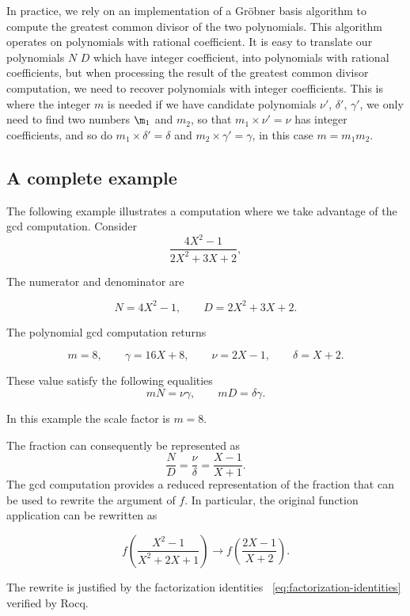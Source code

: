 \documentclass[11pt]{article}
\begin{document}
In practice, we rely on an implementation of a Gröbner basis algorithm to
compute the greatest common divisor of the two polynomials.  This algorithm
operates on polynomials with rational coefficient.  It is easy to translate
our polynomials \(N\) \(D\) which have integer coefficient, into polynomials
with rational coefficients, but when processing the result of the greatest
common divisor computation, we need to recover polynomials with integer
coefficients.  This is where the integer \(m\) is needed if we have candidate
polynomials \(\nu'\), \(\delta'\), \(\gamma'\), we only need to find two numbers
\(\m_1\) and \(m_2\), so that \(m_1 \times \nu' = \nu\) has integer coefficients, and so do \(m_1 \times \delta' = \delta \) and \(m_2 \times \gamma' = \gamma\), in this case \(m=m_1 m_2\).

\subsection{A complete example}

The following example illustrates a computation where we take advantage of
the gcd computation.  Consider
\[
\frac{4 X^2-1}{2X^2+3X+2},
\]

The numerator and denominator are

\[
  N=4X^2-1,\qquad D=2X^2+3X+2.
\]

The polynomial gcd computation returns

\[
  m = 8,
  \qquad
  \gamma=16X+8,
  \qquad
  \nu=2X-1,
  \qquad
  \delta=X+2.
\]

These value satisfy the following equalities
\begin{equation}
  mN=\nu\gamma,
  \qquad
  mD=\delta\gamma.
  \label{eq:factorization-identities}
\end{equation}

In this example the scale factor is $m=8$.

The fraction can consequently be represented as
\[
  \frac{N}{D}
  =
  \frac{\nu}{\delta}
  =
  \frac{X-1}{X+1}.
\]
The gcd computation provides a reduced representation of the fraction that can be used to rewrite the argument of \(f\). In particular, the original function application can be rewritten as

\[
f\left(\frac{X^2-1}{X^2+2X+1}\right)
\longrightarrow
f\left(\frac{2X-1}{X+2}\right).
\]

The rewrite is justified by the factorization identities ~\ref{eq:factorization-identities} verified by Rocq.
\end{document}
